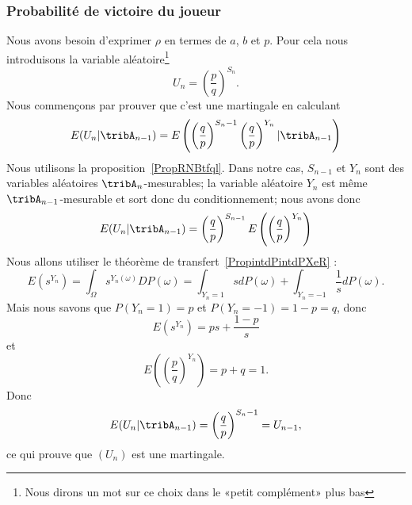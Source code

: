\subsubsection{Probabilité de victoire du joueur}

Nous avons besoin d'exprimer \( \rho\) en termes de \( a\), \( b\) et \( p\). Pour cela nous introduisons la variable aléatoire\footnote{Nous dirons un mot sur ce choix dans le «petit complément» plus bas}
\begin{equation}    \label{EqFUsSnit}
	U_n=\left( \frac{ p }{ q } \right)^{S_n}.
\end{equation}
Nous commençons par prouver que c'est une martingale en calculant
\begin{equation}
	E(U_n|\tribA_{n-1})=E\left( \left( \frac{ q }{ p } \right)^{S_n-1}\left( \frac{ q }{ p } \right)^{Y_n}|\tribA_{n-1} \right)
\end{equation}
Nous utilisons la proposition~\ref{PropRNBtfql}. Dans notre cas, \( S_{n-1}\) et \( Y_n\) sont des variables aléatoires \( \tribA_n\)-mesurables; la variable aléatoire \( Y_n\) est même \( \tribA_{n-1}\)-mesurable et sort donc du conditionnement; nous avons donc
\begin{equation}    \label{EqWTkXcEK}
	E(U_n|\tribA_{n-1})=\left( \frac{ q }{ p } \right)^{S_{n-1}}E\left( \left( \frac{ q }{ p } \right)^{Y_n} \right)
\end{equation}
Nous allons utiliser le théorème de transfert~\ref{PropintdPintdPXeR} :
\begin{equation}
	E(s^{Y_n})=\int_{\Omega}s^{Y_n(\omega)}DP(\omega)=\int_{Y_n=1}sdP(\omega)+\int_{Y_n=-1}\frac{1}{ s }dP(\omega).
\end{equation}
Mais nous savons que \( P(Y_n=1)=p\) et \( P(Y_n=-1)=1-p=q\), donc
\begin{equation}
	E(s^{Y_n})=ps+\frac{ 1-p }{ s }
\end{equation}
et
\begin{equation}
	E\left( \left( \frac{ p }{ q } \right)^{Y_n} \right)=p+q=1.
\end{equation}
Donc
\begin{equation}
	E(U_n|\tribA_{n-1})=\left( \frac{ q }{ p } \right)^{S_n-1}=U_{n-1},
\end{equation}
ce qui prouve que \( (U_n)\) est une martingale.

